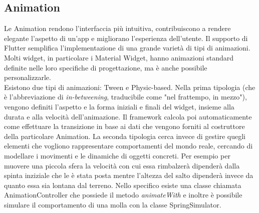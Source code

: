 	\subsection{Animation}
	Le Animation rendono l'interfaccia più intuitiva, contribuiscono a
	rendere elegante 
	l'aspetto di un'app e migliorano l'esperienza dell'utente. Il
	supporto di Flutter semplifica l'implementazione di una grande varietà di tipi di
	animazioni. Molti widget, in particolare i Material Widget, hanno
	animazioni standard definite nelle loro specifiche di progettazione, ma è
	anche possibile personalizzarle. \\
	Esistono due tipi di animazioni: Tween e Physic-based. Nella prima tipologia
	(che è l'abbreviazione di \textit{in-betweening}, traducibile come "nel frattempo,
	in mezzo"), vengono definiti l'aspetto e la forma iniziali e finali del
	widget, insieme alla durata e alla velocità dell'animazione. Il framework
	calcola poi automaticamente come effettuare la transizione in base ai dati
	che vengono forniti al costruttore della particolare Animation. La seconda
	tipologia cerca invece di gestire quegli elementi che vogliono rappresentare
	comportamenti del mondo reale, cercando di modellare i movimenti e le
	dinamiche di oggetti concreti. Per esempio per muovere una piccola sfera la
	velocità con cui essa rimbalzerà dipenderà dalla spinta inziziale che le è
	stata posta mentre l'altezza del salto dipenderà invece da quanto essa sia lontana dal terreno.
	Nello specifico esiste una classe chiamata AnimationController che possiede
	il metodo \textit{animateWith} e inoltre è possibile simulare il
	comportamento di una molla con la classe SpringSimulator.
	


	
